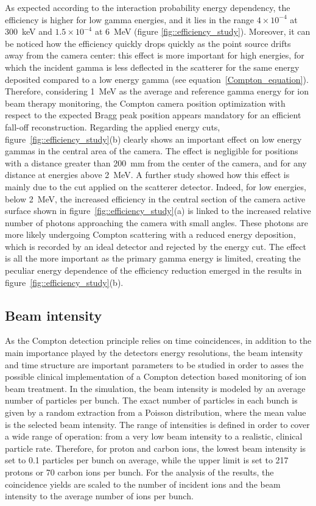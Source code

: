 As expected according to the interaction probability energy dependency, the efficiency is higher for low gamma energies, and it lies in the range $4\times10^{-4}$ at 300~keV and $1.5\times10^{-4}$ at 6~MeV (figure \ref{fig::efficiency_study}). Moreover, it can be noticed how the efficiency quickly drops quickly as the point source drifts away from the camera center: this effect is more important for high energies, for which the incident gamma is less deflected in the scatterer for the same energy deposited compared to a low energy gamma (see equation~\ref{Compton_equation}). Therefore, considering 1~MeV as the average and reference gamma energy for ion beam therapy monitoring, the Compton camera position optimization with respect to the expected Bragg peak position appears mandatory for an efficient fall-off reconstruction.\newline
Regarding the applied energy cuts, figure~\ref{fig::efficiency_study}(b) clearly shows an important effect on low energy gammas in the central area of the camera. The effect is negligible for positions with a distance greater than 200~mm from the center of the camera, and for any distance at energies above 2~MeV. A further study showed how this effect is mainly due to the cut applied on the scatterer detector. Indeed, for low energies, below 2~MeV, the increased efficiency in the central section of the camera active surface shown in figure~\ref{fig::efficiency_study}(a) is linked to the increased relative number of photons approaching the camera with small angles. These photons are more likely undergoing Compton scattering with a reduced energy deposition, which is recorded by an ideal detector and rejected by the energy cut. The effect is all the more important as the primary gamma energy is limited, creating the peculiar energy dependence of the efficiency reduction emerged in the results in figure~\ref{fig::efficiency_study}(b).
 

\subsection{Beam intensity}
\label{Results::beamInt}

As the Compton detection principle relies on time coincidences, in addition to the main importance played by the detectors energy resolutions, the beam intensity and time structure are important parameters to be studied in order to asses the possible clinical implementation of a Compton detection based monitoring of ion beam treatment. In the simulation, the beam intensity is modeled by an average number of particles per bunch. The exact number of particles in each bunch is given by a random extraction from a Poisson distribution, where the mean value is the selected beam intensity. The range of intensities is defined in order to cover a wide range of operation: from a very low beam intensity to a realistic, clinical particle rate. Therefore, for proton and carbon ions, the lowest beam intensity is set to 0.1 particles per bunch on average, while the upper limit is set to 217 protons or 70 carbon ions per bunch. For the analysis of the results, the coincidence yields are scaled to the number of incident ions and the beam intensity to the average number of ions per bunch.
 
